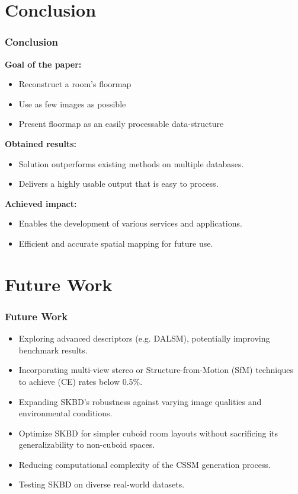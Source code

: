 \documentclass{beamer}
\begin{document}
\section{Conclusion}
\begin{frame}
\frametitle{Conclusion}
\textbf{Goal of the paper:}
\begin{itemize}
    \item Reconstruct a room's floormap
    \item Use as few images as possible
    \item Present floormap as an easily processable data-structure
\end{itemize}
\textbf{Obtained results:}
\begin{itemize}
    \item Solution outperforms existing methods on multiple databases.
    \item Delivers a highly usable output that is easy to process.
\end{itemize}
\textbf{Achieved impact:}
\begin{itemize}
    \item Enables the development of various services and applications.
    \item Efficient and accurate spatial mapping for future use.
\end{itemize}
\end{frame}

\section{Future Work}
\begin{frame}
\frametitle{Future Work}
\begin{itemize}
    \item Exploring advanced descriptors (e.g. DALSM), potentially improving benchmark results.
    \item Incorporating multi-view stereo or Structure-from-Motion (SfM) techniques to achieve (CE) rates below 0.5\%.
    \item Expanding SKBD’s robustness against varying image qualities and environmental conditions. 
    \item Optimize SKBD for simpler cuboid room layouts without sacrificing its generalizability to non-cuboid spaces.
    \item Reducing computational complexity of the CSSM generation process.
    \item Testing SKBD on diverse real-world datasets.
\end{itemize}
\end{frame}
\end{document}
